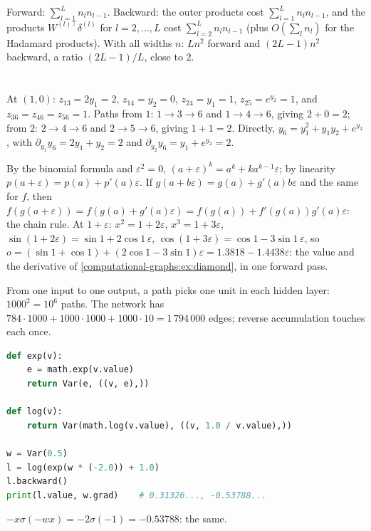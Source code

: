 Forward: $\sum_{l=1}^Ln_ln_{l-1}$. Backward: the outer products cost $\sum_{l=1}^Ln_ln_{l-1}$, and the products $W^{(l)\top}\delta^{(l)}$ for
$l = 2,\dots,L$ cost $\sum_{l=2}^Ln_ln_{l-1}$ (plus $O(\sum_ln_l)$ for the Hadamard products). With all widths $n$: $Ln^2$ forward
and $(2L - 1)n^2$ backward, a ratio $(2L - 1)/L$, close to $2$.

\section{}

At $(1,0)$: $z_{13} = 2y_1 = 2$, $z_{14} = y_2 = 0$, $z_{24} = y_1 = 1$, $z_{25} = e^{y_2} = 1$, and $z_{36} = z_{46} = z_{56} = 1$. Paths from $1$:
$1\to3\to6$ and $1\to4\to6$, giving $2 + 0 = 2$; from $2$: $2\to4\to6$ and $2\to5\to6$, giving $1 + 1 = 2$. Directly,
$y_6 = y_1^2 + y_1y_2 + e^{y_2}$, with $\partial_{y_1}y_6 = 2y_1 + y_2 = 2$ and $\partial_{y_2}y_6 = y_1 + e^{y_2} = 2$.

By the binomial formula and $\varepsilon^2 = 0$, $(a + \varepsilon)^k = a^k + ka^{k-1}\varepsilon$; by linearity $p(a + \varepsilon) = p(a) + p'(a)\varepsilon$. If
$g(a + b\varepsilon) = g(a) + g'(a)b\varepsilon$ and the same for $f$, then $f(g(a + \varepsilon)) = f(g(a) + g'(a)\varepsilon) = f(g(a)) + f'(g(a))g'(a)\varepsilon$: the
chain rule. At $1 + \varepsilon$: $x^2 = 1 + 2\varepsilon$, $x^3 = 1 + 3\varepsilon$, $\sin(1 + 2\varepsilon) = \sin1 + 2\cos1\,\varepsilon$, $\cos(1 + 3\varepsilon) = \cos1 - 3\sin1\,\varepsilon$, so
$o = (\sin1 + \cos1) + (2\cos1 - 3\sin1)\varepsilon = 1.3818 - 1.4438\varepsilon$: the value and the derivative of
\cref{computational-graphs:ex:diamond}, in one forward pass.

From one input to one output, a path picks one unit in each hidden layer: $1000^2 = 10^6$ paths.
The network has $784\cdot1000 + 1000\cdot1000 + 1000\cdot10 = 1\,794\,000$ edges; reverse accumulation touches each once.

\begin{lstlisting}[language=Python]
def exp(v):
    e = math.exp(v.value)
    return Var(e, ((v, e),))

def log(v):
    return Var(math.log(v.value), ((v, 1.0 / v.value),))

w = Var(0.5)
l = log(exp(w * (-2.0)) + 1.0)
l.backward()
print(l.value, w.grad)    # 0.31326..., -0.53788...
\end{lstlisting}
$-x\sigma(-wx) = -2\sigma(-1) = -0.53788$: the same.

